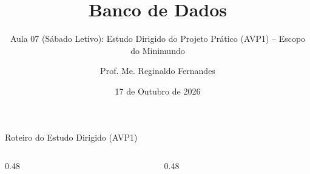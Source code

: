 \documentclass[aspectratio=169,utf8,t]{beamer}
\author{Prof. Me. Reginaldo Fernandes}
\institute{Instituto Federal do Ceará -- Campus Tauá \\ Tecnologia em Telemática}
\title{Banco de Dados}
\subtitle{Aula 07 (Sábado Letivo): Estudo Dirigido do Projeto Prático (AVP1) -- Escopo do Minimundo}
\date{17 de Outubro de 2026}
\begin{document}
\frame[plain]{\titlepage}

\begin{frame}{Roteiro do Estudo Dirigido (AVP1)}
  \begin{columns}[t]
    \begin{column}{0.48\textwidth}
      \scriptsize
      \tableofcontents[sections={1-4}]
    \end{column}
    \begin{column}{0.48\textwidth}
      \scriptsize
      \tableofcontents[sections={5-8}]
    \end{column}
  \end{columns}
\end{frame}









\end{document}
